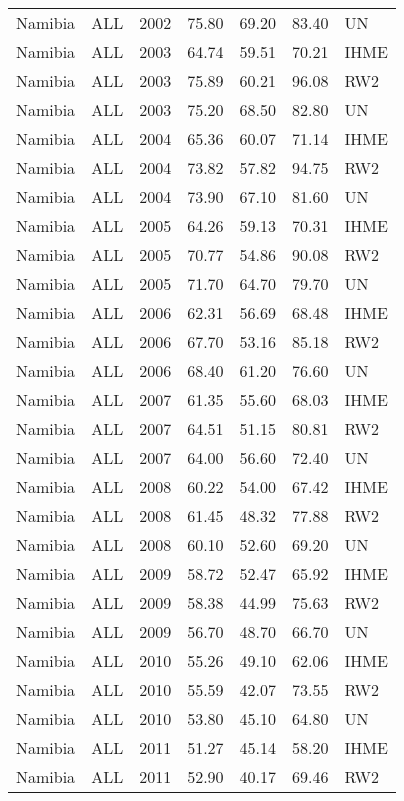 \begin{longtable}{lllrrrl}
  Namibia & ALL & 2002 & 75.80 & 69.20 & 83.40 & UN \\ 
  Namibia & ALL & 2003 & 64.74 & 59.51 & 70.21 & IHME \\ 
  Namibia & ALL & 2003 & 75.89 & 60.21 & 96.08 & RW2 \\ 
  Namibia & ALL & 2003 & 75.20 & 68.50 & 82.80 & UN \\ 
  Namibia & ALL & 2004 & 65.36 & 60.07 & 71.14 & IHME \\ 
  Namibia & ALL & 2004 & 73.82 & 57.82 & 94.75 & RW2 \\ 
  Namibia & ALL & 2004 & 73.90 & 67.10 & 81.60 & UN \\ 
  Namibia & ALL & 2005 & 64.26 & 59.13 & 70.31 & IHME \\ 
  Namibia & ALL & 2005 & 70.77 & 54.86 & 90.08 & RW2 \\ 
  Namibia & ALL & 2005 & 71.70 & 64.70 & 79.70 & UN \\ 
  Namibia & ALL & 2006 & 62.31 & 56.69 & 68.48 & IHME \\ 
  Namibia & ALL & 2006 & 67.70 & 53.16 & 85.18 & RW2 \\ 
  Namibia & ALL & 2006 & 68.40 & 61.20 & 76.60 & UN \\ 
  Namibia & ALL & 2007 & 61.35 & 55.60 & 68.03 & IHME \\ 
  Namibia & ALL & 2007 & 64.51 & 51.15 & 80.81 & RW2 \\ 
  Namibia & ALL & 2007 & 64.00 & 56.60 & 72.40 & UN \\ 
  Namibia & ALL & 2008 & 60.22 & 54.00 & 67.42 & IHME \\ 
  Namibia & ALL & 2008 & 61.45 & 48.32 & 77.88 & RW2 \\ 
  Namibia & ALL & 2008 & 60.10 & 52.60 & 69.20 & UN \\ 
  Namibia & ALL & 2009 & 58.72 & 52.47 & 65.92 & IHME \\ 
  Namibia & ALL & 2009 & 58.38 & 44.99 & 75.63 & RW2 \\ 
  Namibia & ALL & 2009 & 56.70 & 48.70 & 66.70 & UN \\ 
  Namibia & ALL & 2010 & 55.26 & 49.10 & 62.06 & IHME \\ 
  Namibia & ALL & 2010 & 55.59 & 42.07 & 73.55 & RW2 \\ 
  Namibia & ALL & 2010 & 53.80 & 45.10 & 64.80 & UN \\ 
  Namibia & ALL & 2011 & 51.27 & 45.14 & 58.20 & IHME \\ 
  Namibia & ALL & 2011 & 52.90 & 40.17 & 69.46 & RW2 \\ 

\end{longtable}

